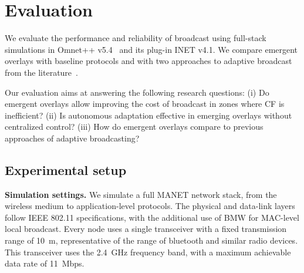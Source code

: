 \section{Evaluation}
\label{sec:evaluation}


We evaluate the performance and reliability of broadcast using full-stack simulations in Omnet++ v5.4~\cite{omnet} and its plug-in INET v4.1.
We compare emergent overlays with baseline protocols and with two approaches to adaptive broadcast from the literature~\cite{2001:AAR:876878.879323,adaptive_group_com_iscc02}.

Our evaluation aims at answering the following research questions:
(i) Do emergent overlays allow improving the cost of broadcast in zones where CF is inefficient?
(ii) Is autonomous adaptation effective in emerging overlays without centralized control?
(iii) How do emergent overlays compare to previous approaches of adaptive broadcasting?

\subsection{Experimental setup}

\noindent
\textbf{Simulation settings.}
We simulate a full MANET network stack, from the wireless medium to application-level protocols.
The physical and data-link layers follow IEEE 802.11 specifications, with the additional use of BMW for MAC-level local broadcast.
Every node uses a single transceiver with a fixed transmission range of 10~m, representative of the range of bluetooth and similar radio devices.  
This transceiver uses the 2.4~GHz frequency band, with a maximum achievable data rate of 11~Mbps.

